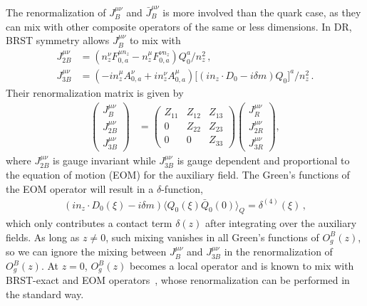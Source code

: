 The renormalization of $J^{\mu\nu}_B$ and $\bar{J}^{\mu\nu}_B$ is more involved than the quark case, as they can mix with other composite operators of the same or less dimensions. In DR, BRST symmetry allows $J^{\mu\nu}_B$
to mix with~\cite{Dorn:1986dt,Zhang:2018diq}
\begin{align}
	J^{\mu\nu}_{2B} &\!=\! \left(n_z^\nu F^{\mu n_z}_{0,a} - n_z^\mu F^{\nu n_z}_{0,a} \right) Q_0^a/n_z^2\,,\\
	J^{\mu\nu}_{3B} &\!=\! (-in_z^\mu\! A^\nu_{0,a}\! +\! in_z^\nu A^\mu_{0,a})\big[(in_z\cdot\! D_0\!-\!i\delta m)Q_0\big]^a\!/n_z^2\,.
\end{align}
Their renormalization matrix is given by~\cite{Dorn:1986dt}
\begin{align}\label{eq:oprenormmix}
	\begin{pmatrix}
		J_{B}^{\mu\nu} \\  J_{2B}^{\mu\nu} \\ J_{3B}^{\mu\nu}
	\end{pmatrix}
	&=
	\begin{pmatrix}
		Z_{11} & Z_{12} & Z_{13}\\ 0 & Z_{22} & Z_{23} \\ 0 & 0 & Z_{33}
	\end{pmatrix}
	\begin{pmatrix}
		J_{R}^{\mu\nu}\\  J_{2R}^{\mu\nu} \\ J_{3R}^{\mu\nu}
	\end{pmatrix}
	,
\end{align}
where $J_{2B}^{\mu\nu}$ is gauge invariant while $J^{\mu\nu}_{3B}$ is gauge dependent and proportional to the equation of motion (EOM) for the auxiliary field. The Green's functions of the EOM operator will result in a $\delta$-function,
\begin{align}
	(in_z\cdot D_0(\xi)-i\delta m)\langle Q_0(\xi)\bar{Q}_0(0)\rangle_Q = \delta^{(4)}(\xi)\,,
\end{align}
which only contributes a contact term $\delta(z)$ after integrating over the auxiliary fields. As long as $z\neq0$, such mixing vanishes in all Green's functions of $O^B_g(z)$, so we can ignore the mixing between $J^{\mu\nu}_{B}$ and $J^{\mu\nu}_{3B}$ in the renormalization of $O^B_g(z)$. At $z=0$, $O^B_g(z)$ becomes a local operator and is known to mix with BRST-exact and EOM operators~\cite{Collins:1994ee}, whose renormalization can be performed in the standard way.


